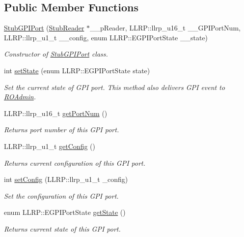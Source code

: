 \subsection*{Public Member Functions}
\begin{DoxyCompactItemize}
\item 
\hyperlink{class_e_l_f_i_n_1_1_stub_g_p_i_port_a5dbd52b913a51f92b201a28b11d53fbd}{Stub\-G\-P\-I\-Port} (\hyperlink{class_e_l_f_i_n_1_1_stub_reader}{Stub\-Reader} $\ast$\-\_\-\-\_\-p\-Reader, L\-L\-R\-P\-::llrp\-\_\-u16\-\_\-t \-\_\-\-\_\-\-G\-P\-I\-Port\-Num, L\-L\-R\-P\-::llrp\-\_\-u1\-\_\-t \-\_\-\-\_\-config, enum L\-L\-R\-P\-::\-E\-G\-P\-I\-Port\-State \-\_\-\-\_\-state)
\begin{DoxyCompactList}\small\item\em Constructor of \hyperlink{class_e_l_f_i_n_1_1_stub_g_p_i_port}{Stub\-G\-P\-I\-Port} class. \end{DoxyCompactList}\item 
int \hyperlink{class_e_l_f_i_n_1_1_stub_g_p_i_port_ae3feb12ce310b0a8cf474367cd3660c2}{set\-State} (enum L\-L\-R\-P\-::\-E\-G\-P\-I\-Port\-State state)
\begin{DoxyCompactList}\small\item\em Set the current state of G\-P\-I port. This method also delivers G\-P\-I event to \hyperlink{class_e_l_f_i_n_1_1_r_o_admin}{R\-O\-Admin}. \end{DoxyCompactList}\item 
L\-L\-R\-P\-::llrp\-\_\-u16\-\_\-t \hyperlink{class_e_l_f_i_n_1_1_stub_g_p_i_port_aeb89a3edf66c95e3e109b06712a4442c}{get\-Port\-Num} ()
\begin{DoxyCompactList}\small\item\em Returns port number of this G\-P\-I port. \end{DoxyCompactList}\item 
L\-L\-R\-P\-::llrp\-\_\-u1\-\_\-t \hyperlink{class_e_l_f_i_n_1_1_stub_g_p_i_port_aa450fcdeb234a02d7e5b47c61ad42798}{get\-Config} ()
\begin{DoxyCompactList}\small\item\em Returns current configuration of this G\-P\-I port. \end{DoxyCompactList}\item 
int \hyperlink{class_e_l_f_i_n_1_1_stub_g_p_i_port_a80e1715d4274215e8c6f6472cd50d14d}{set\-Config} (L\-L\-R\-P\-::llrp\-\_\-u1\-\_\-t \-\_\-config)
\begin{DoxyCompactList}\small\item\em Set the configuration of this G\-P\-I port. \end{DoxyCompactList}\item 
enum L\-L\-R\-P\-::\-E\-G\-P\-I\-Port\-State \hyperlink{class_e_l_f_i_n_1_1_stub_g_p_i_port_ac335751218f9ae57ad4a3edf971b90d5}{get\-State} ()
\begin{DoxyCompactList}\small\item\em Returns current state of this G\-P\-I port. \end{DoxyCompactList}\end{DoxyCompactItemize}
